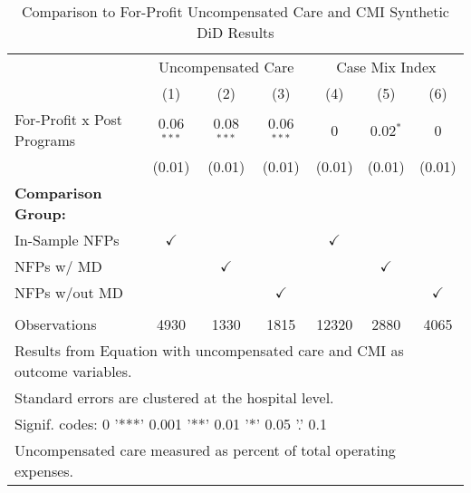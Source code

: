 \begin{table}[ht!]

\caption{\label{tab:forprofit_uncompCMI_synth}Comparison to For-Profit Uncompensated Care and CMI Synthetic DiD Results}
\centering
\begin{tabular}[t]{lcccccc}
\toprule
\multicolumn{1}{c}{ } & \multicolumn{3}{c}{Uncompensated Care} & \multicolumn{3}{c}{Case Mix Index} \\
\cmidrule(l{3pt}r{3pt}){2-4} \cmidrule(l{3pt}r{3pt}){5-7}
 & (1) & (2) & (3) & (4) & (5) & (6)\\
\midrule
For-Profit x Post Programs & 0.06$^{***}$ & 0.08$^{***}$ & 0.06$^{***}$ & 0 & 0.02$^{*}$ & 0\\
 & (0.01) & (0.01) & (0.01) & (0.01) & (0.01) & (0.01)\\
\textbf{Comparison Group:} &  &  &  &  &  & \\
In-Sample NFPs & $\checkmark$ &  &  & $\checkmark$ &  & \\
NFPs w/ MD &  & $\checkmark$ &  &  & $\checkmark$ & \\
\addlinespace
NFPs w/out MD &  &  & $\checkmark$ &  &  & $\checkmark$\\
 &  &  &  &  &  & \\
Observations & 4930 & 1330 & 1815 & 12320 & 2880 & 4065\\
\bottomrule
\multicolumn{7}{l}{\textsuperscript{} Results from Equation with uncompensated care and CMI as outcome variables.}\\
\multicolumn{7}{l}{\textsuperscript{} Standard errors are clustered at the hospital level.}\\
\multicolumn{7}{l}{\textsuperscript{} Signif. codes: 0 '***' 0.001 '**' 0.01 '*' 0.05 '.' 0.1}\\
\multicolumn{7}{l}{\textsuperscript{} Uncompensated care measured as percent of total operating expenses.}\\
\end{tabular}
\end{table}
